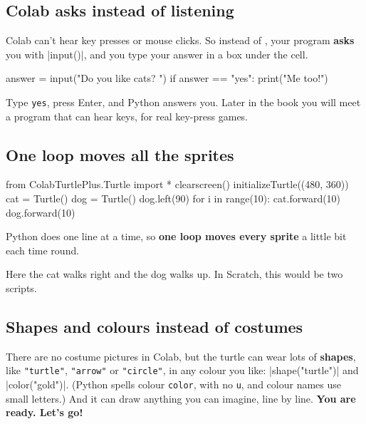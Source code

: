 
\subsection*{Colab asks instead of listening}

Colab can't hear key presses or mouse clicks. So instead of , your program \textbf{asks} you with \py|input()|, and you type your answer in a box under the cell.

\begin{typethis}
answer = input("Do you like cats? ")
if answer == "yes":
    print("Me too!")
\end{typethis}

Type \texttt{yes}, press Enter, and Python answers you. Later in the book you will meet a program that can hear keys, for real key-press games.

\subsection*{One loop moves all the sprites}

\noindent
\begin{minipage}[c]{0.64\linewidth}
\begin{typethis}
from ColabTurtlePlus.Turtle import *
clearscreen()
initializeTurtle((480, 360))
cat = Turtle()
dog = Turtle()
dog.left(90)
for i in range(10):
    cat.forward(10)
    dog.forward(10)
\end{typethis}
\end{minipage}\hfill
\begin{minipage}[c]{0.33\linewidth}\raggedright
Python does one line at a time, so \textbf{one loop moves every sprite} a little bit each time round.

Here the cat walks right and the dog walks up. In Scratch, this would be two scripts.
\end{minipage}

\subsection*{Shapes and colours instead of costumes}

There are no costume pictures in Colab, but the turtle can wear lots of \textbf{shapes}, like \texttt{"turtle"}, \texttt{"arrow"} or \texttt{"circle"}, in any colour you like: \py|shape("turtle")| and \py|color("gold")|. (Python spells colour \texttt{color}, with no \texttt{u}, and colour names use small letters.) And it can draw anything you can imagine, line by line. \textbf{You are ready. Let's go!}
